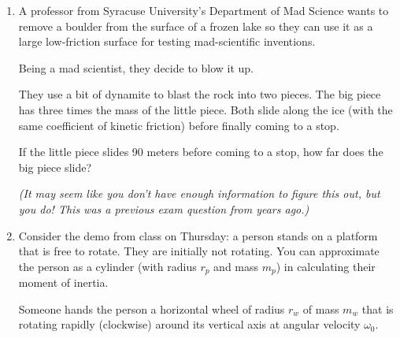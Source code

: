 \documentclass[12pt]{article}
\begin{document}
\begin{enumerate}
{\bf Hint 1:} The ``third kinematics relation'' $v_f^2 - v_0^2 = 2a\Delta x$ that you derived back in February will be very useful here, since you are never interested in the {\it time} these motions take, but care about relating the change in velocity to the distance traveled and the acceleration.

{\bf Hint 2:} There are multiple things that happen here. Conservation of momentum will help you understand some of them, but not others. First, draw four cartoons, and identify which method you can use to understand how to connect each cartoon to the next:

\begin{itemize}
	\item Right after Alice slides the puck to Bob
	\item Right before Bob picks up the puck
	\item Right after Bob picks up the puck
	\item When Bob comes to rest
\end{itemize}


\bigskip \newpage

\item A professor from Syracuse University's Department of Mad Science wants to remove a boulder from the surface of a frozen lake so they can use it as a large low-friction surface for testing mad-scientific inventions. 

Being a mad scientist, they decide to blow it up.

They use a bit of dynamite to blast the rock into two pieces. The big piece has three times the mass of the little piece. Both slide along the ice (with the same coefficient of kinetic friction) before finally coming to a stop.

If the little piece slides 90 meters before coming to a stop, how far does the big piece slide?

{\it (It may seem like you don't have enough information to figure this out, but you do! This was a previous exam question from years ago.)}

\bigskip

\item Consider the demo from class on Thursday: a person stands on a platform that is free to rotate. They are initially not rotating. You can approximate the person as a cylinder (with radius $r_p$ and mass $m_p$) in calculating their moment of inertia.

Someone hands the person a horizontal wheel of radius $r_w$ of mass $m_w$ that is rotating rapidly (clockwise) around its vertical axis at angular velocity $\omega_0$.


\end{enumerate}
\end{document}
